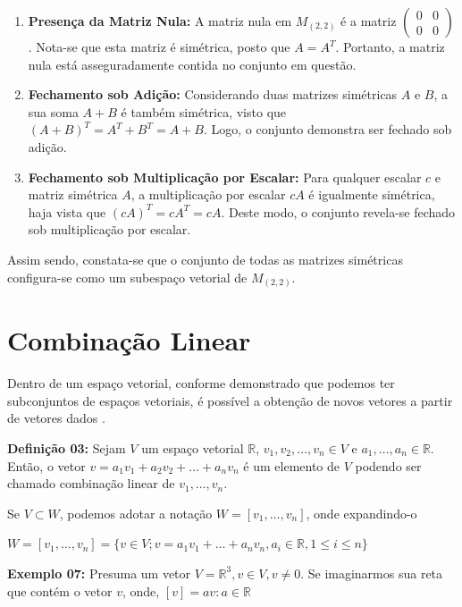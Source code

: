 \begin{enumerate}
    \item \textbf{Presença da Matriz Nula:} A matriz nula em $M_{(2,2)}$ é a matriz $\begin{pmatrix} 0 & 0 \\ 0 & 0 \end{pmatrix}$. Nota-se que esta matriz é simétrica, posto que $A = A^T$. Portanto, a matriz nula está asseguradamente contida no conjunto em questão.
    
    \item \textbf{Fechamento sob Adição:} Considerando duas matrizes simétricas $A$ e $B$, a sua soma $A + B$ é também simétrica, visto que $(A + B)^T = A^T + B^T = A + B$. Logo, o conjunto demonstra ser fechado sob adição.
    
    \item \textbf{Fechamento sob Multiplicação por Escalar:} Para qualquer escalar $c$ e matriz simétrica $A$, a multiplicação por escalar $cA$ é igualmente simétrica, haja vista que $(cA)^T = cA^T = cA$. Deste modo, o conjunto revela-se fechado sob multiplicação por escalar.
\end{enumerate}

Assim sendo, constata-se que o conjunto de todas as matrizes simétricas configura-se como um subespaço vetorial de $M_{(2,2)}$.

\section{Combinação Linear}
Dentro de um espaço vetorial, conforme demonstrado que podemos ter subconjuntos de espaços vetoriais, é possível a obtenção de novos vetores a partir de vetores dados \cite{boldrini1980}.

\noindent\textbf{Definição 03:} Sejam $V$ um espaço vetorial $\mathbb{R}$, $v_1, v_2, \ldots, v_n \in V$ e $a_1, \ldots, a_n \in \mathbb{R}$. Então, o vetor $v = a_1v_1 + a_2v_2 + \ldots + a_nv_n$ é um elemento de $V$ podendo ser chamado combinação linear de $v_1, \ldots, v_n$.

Se $V \subset W$, podemos adotar a notação $W = [v_1, \ldots, v_n]$, onde expandindo-o

\centerline{$W = [v_1, \ldots, v_n] = \{v \in V; v = a_1v_1 + \ldots + a_nv_n, a_i \in \mathbb{R}, 1 \leqslant i \leqslant n\}$}

\noindent\textbf{Exemplo 07:} Presuma um vetor $V = \mathbb{R}^3, v \in V, v \neq 0$. Se imaginarmos sua reta que contém o vetor $v$, onde, $[v] = {av: a \in \mathbb{R}}$


